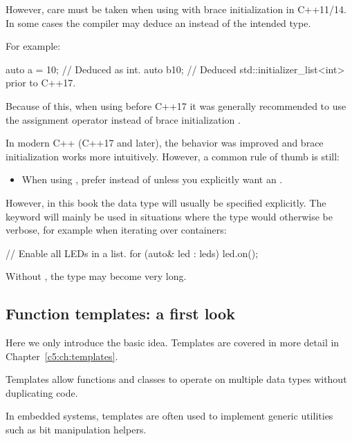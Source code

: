 However, care must be taken when using  with brace initialization \code{{}} in
C++11/14. In some cases the compiler may deduce an  instead of the
intended type.

For example:

\begin{cppcode}
auto a = 10; // Deduced as int.
auto b{10};  // Deduced std::initializer_list<int> prior to C++17.
\end{cppcode}

\noindent Because of this, when using  before C++17 it was generally recommended to use
the assignment operator \code{=} instead of brace initialization \code{{}}.

In modern C++ (C++17 and later), the behavior was improved and brace initialization works more
intuitively. However, a common rule of thumb is still:
\begin{itemize}
  \item When using , prefer \code{=} instead of \code{{}} unless you explicitly want an
    .
\end{itemize}
However, in this book the data type will usually be specified explicitly. The  keyword
will mainly be used in situations where the type would otherwise be verbose, for example when
iterating over containers:

\begin{cppcode}
// Enable all LEDs in a list.
for (auto& led : leds)
{
    led.on();
}
\end{cppcode}

\noindent Without , the type may become very long.

\subsection{Function templates: a first look}
\label{c1:sec:templates}
\note Here we only introduce the basic idea. Templates are covered in more detail in
Chapter~\ref{c5:ch:templates}.

Templates allow functions and classes to operate on multiple data types without duplicating code.

In embedded systems, templates are often used to implement generic utilities such as bit
manipulation helpers.

